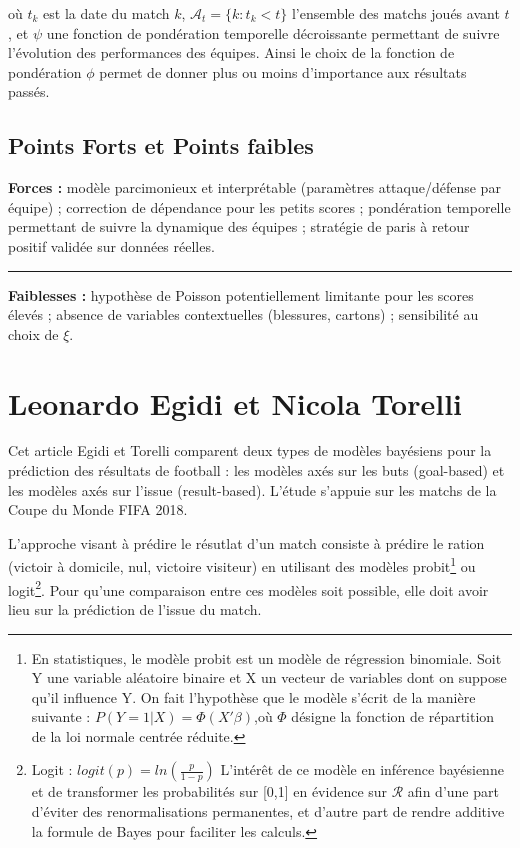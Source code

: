 \documentclass[11pt, a4paper]{article}
\begin{document}
où $t_k$ est la date du match $k$, $\mathcal{A}_t=\{ k:t_k < t \}$ 
l'ensemble des matchs joués avant $t$, et $\psi$ une fonction de pondération 
temporelle décroissante permettant de suivre l'évolution des performances des équipes.
Ainsi le choix de la fonction de pondération $\phi$ permet de donner plus ou moins 
d'importance aux résultats passés.


\subsection{Points Forts et Points faibles}

\textbf{Forces :} modèle parcimonieux et interprétable (paramètres attaque/défense
par équipe) ; correction de dépendance pour les petits scores ; pondération temporelle
permettant de suivre la dynamique des équipes ; stratégie de paris à retour positif
validée sur données réelles.
\vspace*{0.5cm}
\hrule
\vspace*{0.5cm}
\textbf{Faiblesses :} hypothèse de Poisson potentiellement limitante pour les scores
élevés ; absence de variables contextuelles (blessures, cartons) ; sensibilité au
choix de $\xi$.


\section{Leonardo Egidi et Nicola Torelli}


Cet article \cite{egidi} Egidi et Torelli comparent deux types de modèles bayésiens pour la prédiction des
résultats de football : les modèles axés sur les buts (goal-based) et les modèles axés sur l'issue
(result-based). L'étude s'appuie sur les matchs de la Coupe du Monde FIFA 2018.

L'approche visant à prédire le résutlat d'un match consiste à prédire le ration 
(victoir à domicile, nul, victoire visiteur) en utilisant des modèles 
probit\footnote{En statistiques, le modèle probit est un modèle de régression 
binomiale. Soit Y une variable aléatoire binaire et X un vecteur de variables dont 
on suppose qu'il influence Y. On fait l'hypothèse que le modèle s'écrit de la 
manière suivante : $P(Y=1|X)=\Phi(X'\beta)$,où $\Phi$ désigne la fonction de 
répartition de la loi normale centrée réduite.} 
ou logit\footnote{Logit : $logit(p)=ln(\frac{p}{1-p})$ L'intérêt de ce modèle en 
inférence bayésienne et de transformer les probabilités sur [0,1] en évidence sur $\mathcal{R}$ 
afin d'une part d'éviter des renormalisations permanentes, et d'autre part de rendre 
additive la formule de Bayes pour faciliter les calculs.}. Pour qu'une comparaison 
entre ces modèles soit possible, elle doit avoir lieu sur la prédiction de l'issue 
du match. 
\end{document}
